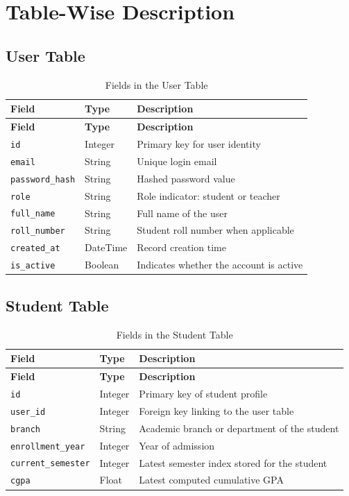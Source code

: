 \section{Table-Wise Description}
\subsection{User Table}
\begin{longtable}{p{}p{}p{}}
\caption{Fields in the User Table}\\
\toprule
\textbf{Field} & \textbf{Type} & \textbf{Description} \\
\midrule
\endfirsthead
\toprule
\textbf{Field} & \textbf{Type} & \textbf{Description} \\
\midrule
\endhead
\texttt{id} & Integer & Primary key for user identity \\
\texttt{email} & String & Unique login email \\
\texttt{password\_hash} & String & Hashed password value \\
\texttt{role} & String & Role indicator: student or teacher \\
\texttt{full\_name} & String & Full name of the user \\
\texttt{roll\_number} & String & Student roll number when applicable \\
\texttt{created\_at} & DateTime & Record creation time \\
\texttt{is\_active} & Boolean & Indicates whether the account is active \\
\bottomrule
\end{longtable}

\subsection{Student Table}
\begin{longtable}{p{}p{}p{}}
\caption{Fields in the Student Table}\\
\toprule
\textbf{Field} & \textbf{Type} & \textbf{Description} \\
\midrule
\endfirsthead
\toprule
\textbf{Field} & \textbf{Type} & \textbf{Description} \\
\midrule
\endhead
\texttt{id} & Integer & Primary key of student profile \\
\texttt{user\_id} & Integer & Foreign key linking to the user table \\
\texttt{branch} & String & Academic branch or department of the student \\
\texttt{enrollment\_year} & Integer & Year of admission \\
\texttt{current\_semester} & Integer & Latest semester index stored for the student \\
\texttt{cgpa} & Float & Latest computed cumulative GPA \\
\bottomrule
\end{longtable}

